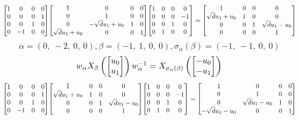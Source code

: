 \documentclass[11pt]{article}
\theoremstyle{definition}
\begin{document}
\[
\scaletoalign{\textwidth}{{\left[\begin{matrix}1 & 0 & 0 & 0\\0 & 0 & 0 & 1\\0 & 0 & 1 & 0\\0 & -1 & 0 & 0\end{matrix}\right]} {\left[\begin{matrix}1 & 0 & 0 & 0\\0 & 1 & 0 & 0\\0 & - \sqrt{d} u_{1} + u_{0} & 1 & 0\\\sqrt{d} u_{1} + u_{0} & 0 & 0 & 1\end{matrix}\right]} {\left[\begin{matrix}1 & 0 & 0 & 0\\0 & 0 & 0 & -1\\0 & 0 & 1 & 0\\0 & 1 & 0 & 0\end{matrix}\right]} = {\left[\begin{matrix}1 & 0 & 0 & 0\\\sqrt{d} u_{1} + u_{0} & 1 & 0 & 0\\0 & 0 & 1 & \sqrt{d} u_{1} - u_{0}\\0 & 0 & 0 & 1\end{matrix}\right]}}
\]
\[
\alpha = \left( 0, \  -2, \  0, \  0\right), \beta = \left( -1, \  1, \  0, \  0\right), \sigma_{\alpha}(\beta) = \left( -1, \  -1, \  0, \  0\right)
\]
\[
\scaletoalign{\textwidth}{w_{\alpha} X_{\beta}\left(\left[\begin{matrix}u_{0}\\u_{1}\end{matrix}\right]\right) w_{\alpha}^{-1} = X_{\sigma_{\alpha}\left(\beta\right)}\left(\left[\begin{matrix}- u_{0}\\- u_{1}\end{matrix}\right]\right)}
\]
\[
\scaletoalign{\textwidth}{{\left[\begin{matrix}1 & 0 & 0 & 0\\0 & 0 & 0 & 1\\0 & 0 & 1 & 0\\0 & -1 & 0 & 0\end{matrix}\right]} {\left[\begin{matrix}1 & 0 & 0 & 0\\\sqrt{d} u_{1} + u_{0} & 1 & 0 & 0\\0 & 0 & 1 & \sqrt{d} u_{1} - u_{0}\\0 & 0 & 0 & 1\end{matrix}\right]} {\left[\begin{matrix}1 & 0 & 0 & 0\\0 & 0 & 0 & -1\\0 & 0 & 1 & 0\\0 & 1 & 0 & 0\end{matrix}\right]} = {\left[\begin{matrix}1 & 0 & 0 & 0\\0 & 1 & 0 & 0\\0 & \sqrt{d} u_{1} - u_{0} & 1 & 0\\- \sqrt{d} u_{1} - u_{0} & 0 & 0 & 1\end{matrix}\right]}}
\]
\end{document}
